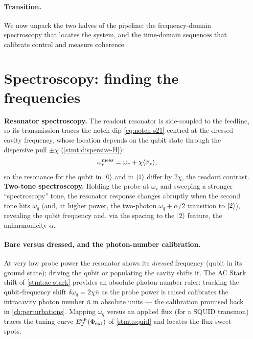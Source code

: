 \paragraph{Transition.}
We now unpack the two halves of the pipeline: the
frequency-domain spectroscopy that locates the system, and the
time-domain sequences that calibrate control and measure coherence.

\section{Spectroscopy: finding the frequencies}
\label{sec:spectroscopy}

\begin{statement}
\label{stmt:spectroscopy}
\textbf{Resonator spectroscopy.} The readout resonator is side-coupled
to the feedline, so its transmission traces the notch dip
\cref{eq:notch-s21} centred at the dressed cavity frequency, whose
location depends on the qubit state through the dispersive pull
$\pm\chi$ (\cref{stmt:dispersive-H}):
\begin{equation}
\label{eq:dressed-cavity}
\omega_r^{\rm meas} = \omega_r + \chi\langle\hat\sigma_z\rangle,
\end{equation}
so the resonance for the qubit in $\ket0$ and in $\ket1$ differ by
$2\chi$, the readout contrast. \textbf{Two-tone spectroscopy.} Holding
the probe at $\omega_r$ and sweeping a stronger ``spectroscopy'' tone,
the resonator response changes abruptly when the second tone hits
$\omega_q$ (and, at higher power, the two-photon $\omega_q+\alpha/2$
transition to $\ket2$), revealing the qubit frequency and, via the
spacing to the $\ket2$ feature, the anharmonicity $\alpha$.
\end{statement}

\paragraph{Bare versus dressed, and the photon-number calibration.}
At very low probe power the resonator shows its \emph{dressed}
frequency (qubit in its ground state); driving the qubit or populating
the cavity shifts it. The AC Stark shift of \cref{stmt:ac-stark}
provides an absolute photon-number ruler: tracking the qubit-frequency
shift $\delta\omega_q=2\chi\bar n$ as the probe power is raised
calibrates the intracavity photon number $\bar n$ in absolute units ---
the calibration promised back in \cref{ch:perturbations}. Mapping
$\omega_q$ versus an applied flux (for a SQUID transmon) traces the
tuning curve $E_J^{\rm eff}(\Phi_{\rm ext})$ of \cref{stmt:squid} and
locates the flux sweet spots.

